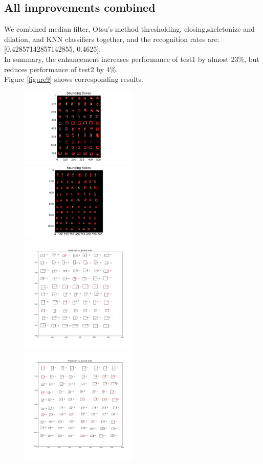 \documentclass{extarticle}
\theoremstyle{definition}
\theoremstyle{definition}
\begin{document}
\subsection{All improvements combined}
We combined median filter, Otsu's method thresholding, closing,skeletonize and dilation, and KNN classifiers together, and the recognition rates are: [0.42857142857142855, 0.4625]. \\
In summary, the enhancement increases performance of test1 by almost 23\%, but reduces performance of test2 by 4\%. \\
Figure \ref{figure9} shows corresponding results.\\
\begin{figure}[H]
	\includegraphics[width = 0.5\textwidth]{./figures/test1_Bounding_Boxes_improve_combined.png}
	\includegraphics[width = 0.5\textwidth]{./figures/test2_Bounding_Boxes_improve_combined.png}
	\includegraphics[width = 0.5\textwidth]{./figures/test1_gt_Prediction_vs_ground_truth_improve_combined.png}
	\includegraphics[width = 0.5\textwidth]{./figures/test2_gt_Prediction_vs_ground_truth_improve_combined.png}	

\end{figure}
\end{document}
